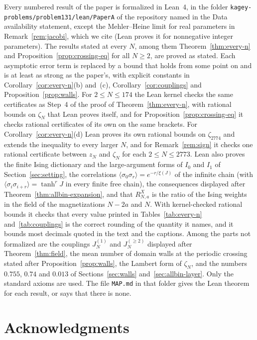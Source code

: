 \documentclass[11pt]{article}
\theoremstyle{definition}
\theoremstyle{remark}
\begin{document}
Every numbered result of the paper is formalized in Lean~4, in the folder
\nolinkurl{kagey-problems/problem131/lean/PaperA} of the repository named in
the Data availability statement, except the Mehler--Heine limit for real
parameters in Remark~\ref{rem:jacobi}, which we cite (Lean proves it for
nonnegative integer parameters). The results stated at every $N$, among them
Theorem~\ref{thm:every-n} and Proposition~\ref{prop:crossing-eq} for all
$N\ge2$, are proved as stated. Each asymptotic error term is replaced by a
bound that holds from some point on and is at least as strong as the paper's,
with explicit constants in Corollary~\ref{cor:every-n}(b) and~(c),
Corollary~\ref{cor:couplings} and Proposition~\ref{prop:walls}. For
$2\le N\le174$ the Lean kernel checks the same certificates as Step~4 of the
proof of Theorem~\ref{thm:every-n}, with rational bounds on $\zeta_N$ that Lean
proves itself, and for Proposition~\ref{prop:crossing-eq} it checks rational
certificates of its own on the same brackets. For
Corollary~\ref{cor:every-n}(d) Lean proves its own rational bounds on
$\zeta_{2774}$ and extends the inequality to every larger $N$, and for
Remark~\ref{rem:sign} it checks one rational certificate between $z_N$ and
$\zeta_N$ for each $2\le N\le2773$. Lean also proves the finite Ising
dictionary and the large-argument forms of $I_0$ and $I_1$ of
Section~\ref{sec:setting}, the correlations
$\langle\sigma_0\sigma_r\rangle=e^{-r/\xi(J)}$ of the infinite chain (with
$\langle\sigma_i\sigma_{i+r}\rangle=\tanh^rJ$ in every finite free chain), the
consequences displayed after Theorem~\ref{thm:allbin-expansion}, and that
$R^X_{N,a}$ is the ratio of the Ising weights in the field of the
magnetizations $N-2a$ and $N$. With kernel-checked rational bounds it checks
that every value printed in Tables~\ref{tab:every-n} and~\ref{tab:couplings} is
the correct rounding of the quantity it names, and it bounds most decimals
quoted in the text and the captions. Among the parts not formalized are the couplings
$J_N^{(1)}$ and $J_N^{(\ge2)}$ displayed after Theorem~\ref{thm:field}, the
mean number of domain walls at the periodic crossing stated after
Proposition~\ref{prop:walls}, the Lambert form of $\zeta_N$, and the numbers
$0.755$, $0.74$ and $0.013$ of Sections~\ref{sec:walls}
and~\ref{sec:allbin-layer}. Only the standard axioms are used. The file
\nolinkurl{MAP.md} in that folder gives the Lean theorem for each result, or
says that there is none.

\section*{Acknowledgments}
\end{document}
